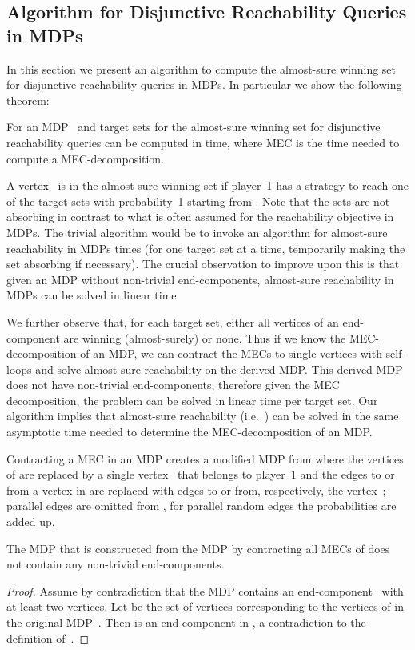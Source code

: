 \documentclass[11pt,letterpaper]{article}
\begin{document}
{\subsection{Algorithm for Disjunctive Reachability Queries in MDPs}
In this section we present an algorithm to compute the almost-sure winning
set for disjunctive reachability queries in MDPs. 
In particular we show the following theorem:
\begin{theorem}\label{th:timedrmdp}
	For an MDP~ and target sets  
for  the almost-sure winning set for disjunctive reachability
queries can be computed in  time, where MEC is the time 
needed to compute a MEC-decomposition.
\end{theorem}
A vertex~ is in the almost-sure winning
set if player~1 has a strategy to reach one of the  target sets 
with probability~1 starting from .
Note that the sets  are not absorbing in contrast to what is often 
assumed for the reachability objective in MDPs. The trivial algorithm would be 
to invoke an algorithm for almost-sure reachability in MDPs  times (for one 
target set  at a time, temporarily making the set  absorbing
if necessary). The 
crucial observation to improve upon this is that given an MDP without 
non-trivial end-components, almost-sure reachability in MDPs can be solved in 
linear time.

We further observe that, for each target set,
either all vertices of an end-component are winning (almost-surely) or none.
Thus if we know the MEC-decomposition of an MDP, 
we can contract the MECs 
to single vertices with self-loops and solve almost-sure reachability on the 
derived MDP. This derived MDP does not have non-trivial end-components,
therefore given the MEC decomposition, the problem can be solved in linear time
per target set. Our algorithm implies that
almost-sure reachability (i.e.\ ) can be solved in the same asymptotic 
time needed to determine the MEC-decomposition of an MDP.

\begin{definition}
	Contracting a MEC  in an MDP  
	creates a modified MDP  from  where the vertices of  are 
	replaced by a single vertex~ that belongs to player~1 and the edges to or 
	from a vertex in  are replaced with edges to or from, respectively, the 
	vertex~; parallel edges are omitted from , for parallel random edges
	the probabilities are added up.
\end{definition}

\begin{observation}\label{obs:mecfree}
	The MDP  that is constructed from the MDP  by contracting all 
	MECs of  does not contain any non-trivial end-components.
\end{observation}
\begin{proof}
Assume by contradiction that the MDP  contains an end-component~ 
with at least two vertices. Let  be the set of vertices corresponding 
to the vertices of  in the original MDP~. Then  is an 
end-component in , a contradiction to the definition of~.
\end{proof}

}
\end{document}

